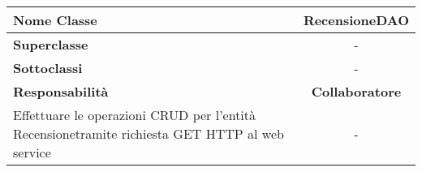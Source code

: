 
\setcounter{table}{0}
\begin{table}[H]
    \centering
    \begin{tabularx}{\textwidth}{||   X  ||  c   ||}
        \rowcolor{Gray}
        \hline
        \textbf{Nome Classe} & RecensioneDAO \\
        \hline
        \textbf{Superclasse}  &  - \\
        \hline
        \textbf{Sottoclassi} & - \\
        \hline
        \hline
         \textbf{Responsabilità} & \textbf{Collaboratore} \\
         \hline
          Effettuare le operazioni \gls{CRUD} per l'entità Recensionetramite richiesta GET HTTP al web service & - \\
         \hline
    \end{tabularx}
\end{table}
